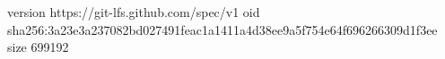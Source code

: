 version https://git-lfs.github.com/spec/v1
oid sha256:3a23e3a237082bd027491feac1a1411a4d38ee9a5f754e64f696266309d1f3ee
size 699192
